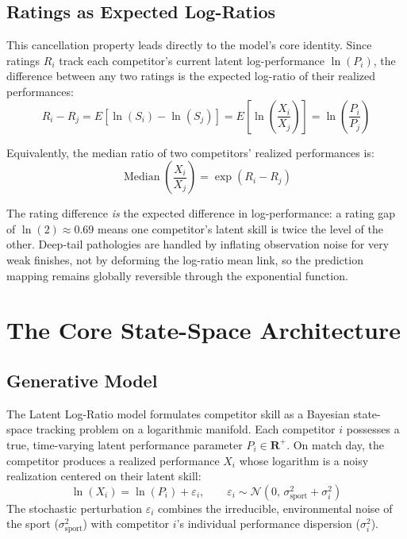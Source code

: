 \documentclass[12pt]{article}
\newcommand{\sigmai}{\sigma_i^2}
\newcommand{\ssport}{\sigma_{\mathrm{sport}}^2}      %
\DeclareMathOperator*{\median}{Median}
\begin{document}
	\subsection{Ratings as Expected Log-Ratios}
	This cancellation property leads directly to the model's core identity. Since ratings $R_i$ track each competitor's current latent log-performance $\ln(P_i)$, the difference between any two ratings is the expected log-ratio of their realized performances:
	\begin{equation}
		R_i - R_j = E[\ln(S_i) - \ln(S_j)] = E\!\left[\ln\!\left(\frac{X_i}{X_j}\right)\right] = \ln\!\left(\frac{P_i}{P_j}\right)
	\end{equation}

	Equivalently, the median ratio of two competitors' realized performances is:
	\begin{equation}
		\median\!\left(\frac{X_i}{X_j}\right) = \exp(R_i - R_j)
	\end{equation}

	The rating difference \textit{is} the expected difference in log-performance: a rating gap of $\ln(2) \approx 0.69$ means one competitor's latent skill is twice the level of the other. Deep-tail pathologies are handled by inflating observation noise for very weak finishes, not by deforming the log-ratio mean link, so the prediction mapping remains globally reversible through the exponential function.
	
	\section{The Core State-Space Architecture}
	\label{sec:core}
	
	\subsection{Generative Model}
	The Latent Log-Ratio model formulates competitor skill as a Bayesian state-space tracking problem on a logarithmic manifold. Each competitor $i$ possesses a true, time-varying latent performance parameter $P_i \in \mathbf{R}^+$. On match day, the competitor produces a realized performance $X_i$ whose logarithm is a noisy realization centered on their latent skill:
	\begin{equation}
		\ln(X_i) = \ln(P_i) + \varepsilon_i, \qquad \varepsilon_i \sim \mathcal{N}(0,\, \ssport + \sigmai)
	\end{equation}
	The stochastic perturbation $\varepsilon_i$ combines the irreducible, environmental noise of the sport ($\ssport$) with competitor $i$'s individual performance dispersion ($\sigmai$). 
	
\end{document}
